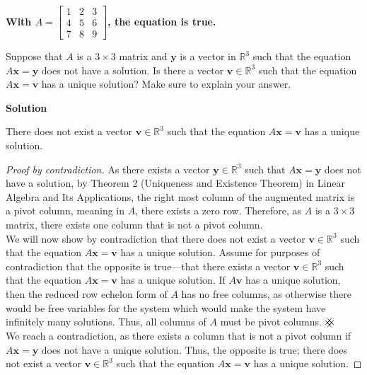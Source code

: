 \documentclass[11pt]{scrartcl}
\theoremstyle{dotlessP}
\theoremstyle{dotlessN}
\newcommand{\reals}{\mathbb{R}} %
\newcommand{\contradiction}{{\hbox{%
    \setbox0=\hbox{$\mkern-3mu\times\mkern-3mu$}%
    \setbox1=\hbox to0pt{\hss$\times$\hss}%
    \copy0\raisebox{0.5\wd0}{\copy1}\raisebox{-0.5\wd0}{\box1}\box0
}}}
\begin{document}
\textbf{With $A = 
\begin{bmatrix}
	1 & 2 & 3 \\
	4 & 5 & 6 \\
	7 & 8 & 9
\end{bmatrix}$, the equation is true.}
\begin{ques}
	Suppose that $A$ is a $3 \times 3$ matrix and $\bm{y}$ is a vector in $\reals^3$ such that the equation $A\bm{x} = \bm{y}$ does not have a solution. Is there a vector $\bm{v} \in \reals^3$ such that the equation $A\bm{x} = \bm{v}$ has a unique solution? Make sure to explain your answer.	
\end{ques} 
\textbf{Solution}
\begin{claim*}
There does not exist a vector $\bm{v} \in \reals^3$ such that the equation $A\bm{x} = \bm{v}$ has a unique solution.
\end{claim*}
\begin{proof}
	[Proof by contradiction]
	As there exists a vector $\bm{y} \in \reals^3$ such that $A\bm{x} = \bm{y}$ does not have a solution, by Theorem 2 (Uniqueness and Existence Theorem) in Linear Algebra and Its Applications, the right most column of the augmented matrix is a pivot column, meaning in $A$, there exists a zero row. Therefore, as $A$ is a $3 \times 3$ matrix, there exists one column that is not a pivot column. 
	\\

	We will now show by contradiction that there does not exist a vector $\bm{v} \in \reals^3$ such that the equation $A\bm{x} = \bm{v}$ has a unique solution. Assume for purposes of contradiction that the opposite is true---that there exists a vector $\bm{v} \in \reals^3$ such that the equation $A\bm{x} = \bm{v}$ has a unique solution. If $A\bm{v}$ has a unique solution, then the reduced row echelon form of $A$ has no free columns, as otherwise there would be free variables for the system which would make the system have infinitely many solutions. Thus, all columns of $A$ must be pivot columns. $\contradiction$
\\

We reach a contradiction, as there exists a column that is not a pivot column if  $A \bm{x} = \bm{y}$ does not have a unique solution. Thus, the opposite is true; there does not exist a vector $\bm{v} \in \reals^3$ such that the equation $A\bm{x} = \bm{v}$ has a unique solution.
\end{proof}
\end{document}
